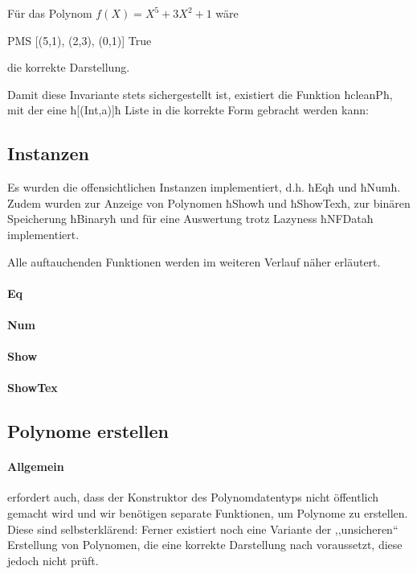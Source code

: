 \begin{beispiel}
  Für das Polynom $f(X) = X^5 + 3X^2 + 1$ wäre 
  \begin{hcode}
    PMS [(5,1), (2,3), (0,1)] True
  \end{hcode}
  die korrekte Darstellung.
\end{beispiel}

Damit diese Invariante stets sichergestellt ist, existiert die Funktion
ħcleanPħ, mit der eine ħ[(Int,a)]ħ Liste in die korrekte Form gebracht werden
kann:

\subsection{Instanzen}
Es wurden die offensichtlichen Instanzen implementiert, d.h.
ħEqħ und ħNumħ. Zudem wurden zur Anzeige von Polynomen ħShowħ und ħShowTexħ, zur
binären Speicherung ħBinaryħ und für eine Auswertung trotz Lazyness ħNFDataħ
implementiert.

Alle auftauchenden Funktionen werden im weiteren Verlauf näher erläutert.

\paragraph{Eq}\makebox{} 

\paragraph{Num}\makebox{}  
    
\paragraph{Show}\makebox{}  

\paragraph{ShowTex}\makebox{}  

\subsection{Polynome erstellen}
\paragraph{Allgemein}
 erfordert auch, dass der Konstruktor des Polynomdatentyps
nicht öffentlich gemacht wird und wir benötigen separate Funktionen, um
Polynome zu erstellen. Diese sind selbsterklärend:
Ferner existiert noch eine Variante der ,,unsicheren`` Erstellung von
Polynomen, die eine korrekte Darstellung nach  voraussetzt,
diese jedoch nicht prüft. 


